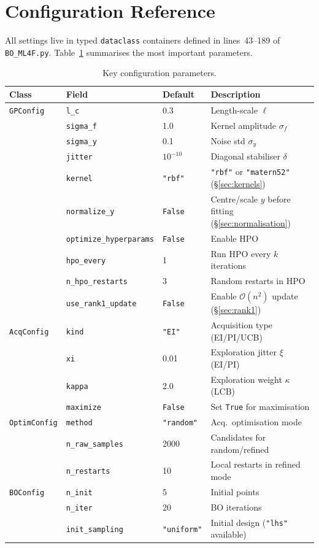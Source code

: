 \documentclass[11pt,a4paper]{article}
\theoremstyle{remark}
\newcommand{\codefile}[1]{\texttt{#1}}
\newcommand{\coderange}[2]{lines~#1--#2}
\begin{document}
\section{Configuration Reference}
\label{sec:config}

All settings live in typed \texttt{dataclass} containers defined in
\coderange{43}{189} of \codefile{BO\_ML4F.py}.
Table~\ref{tab:config} summarises the most important parameters.

\begin{table}[ht]
\centering
\caption{Key configuration parameters.}
\label{tab:config}
\small
\begin{tabular}{llll}
\toprule
\textbf{Class} & \textbf{Field} & \textbf{Default} & \textbf{Description}\\
\midrule
\texttt{GPConfig} & \texttt{l\_c} & 0.3
  & Length-scale $\ell$ \\
 & \texttt{sigma\_f} & 1.0
  & Kernel amplitude $\sigma_f$ \\
 & \texttt{sigma\_y} & 0.1
  & Noise std $\sigma_y$ \\
 & \texttt{jitter} & $10^{-10}$
  & Diagonal stabiliser $\delta$ \\
 & \texttt{kernel} & \texttt{"rbf"}
  & \texttt{"rbf"} or \texttt{"matern52"} (\S\ref{sec:kernels}) \\
 & \texttt{normalize\_y} & \texttt{False}
  & Centre/scale $y$ before fitting (\S\ref{sec:normalisation}) \\
 & \texttt{optimize\_hyperparams} & \texttt{False}
  & Enable HPO \\
 & \texttt{hpo\_every} & 1
  & Run HPO every $k$ iterations \\
 & \texttt{n\_hpo\_restarts} & 3
  & Random restarts in HPO \\
 & \texttt{use\_rank1\_update} & \texttt{False}
  & Enable $\mathcal{O}(n^2)$ update (\S\ref{sec:rank1}) \\
\midrule
\texttt{AcqConfig} & \texttt{kind} & \texttt{"EI"}
  & Acquisition type (EI/PI/UCB) \\
 & \texttt{xi} & 0.01
  & Exploration jitter $\xi$ (EI/PI) \\
 & \texttt{kappa} & 2.0
  & Exploration weight $\kappa$ (LCB) \\
 & \texttt{maximize} & \texttt{False}
  & Set \texttt{True} for maximisation \\
\midrule
\texttt{OptimConfig} & \texttt{method} & \texttt{"random"}
  & Acq.\ optimisation mode \\
 & \texttt{n\_raw\_samples} & 2000
  & Candidates for random/refined \\
 & \texttt{n\_restarts} & 10
  & Local restarts in refined mode \\
\midrule
\texttt{BOConfig} & \texttt{n\_init} & 5
  & Initial points \\
 & \texttt{n\_iter} & 20
  & BO iterations \\
 & \texttt{init\_sampling} & \texttt{"uniform"}
  & Initial design (\texttt{"lhs"} available) \\
\bottomrule
\end{tabular}
\end{table}
\end{document}
